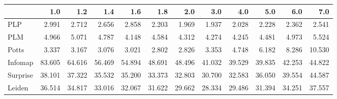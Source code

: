 \begin{tabular}{lrrrrrrrrrrr}
\toprule
{} &    1.0 &    1.2 &    1.4 &    1.6 &    1.8 &    2.0 &    3.0 &    4.0 &    5.0 &    6.0 &    7.0 \\
\midrule
PLP      &  2.991 &  2.712 &  2.656 &  2.858 &  2.203 &  1.969 &  1.937 &  2.028 &  2.228 &  2.362 &  2.541 \\
PLM      &  4.966 &  5.071 &  4.787 &  4.148 &  4.584 &  4.312 &  4.274 &  4.245 &  4.481 &  4.973 &  5.524 \\
Potts    &  3.337 &  3.167 &  3.076 &  3.021 &  2.802 &  2.826 &  3.353 &  4.748 &  6.182 &  8.286 & 10.530 \\
Infomap  & 83.605 & 64.616 & 56.469 & 54.894 & 48.691 & 48.496 & 41.032 & 39.529 & 39.835 & 42.253 & 44.822 \\
Surprise & 38.101 & 37.322 & 35.532 & 35.200 & 33.373 & 32.803 & 30.700 & 32.583 & 36.050 & 39.554 & 44.587 \\
Leiden   & 36.514 & 34.817 & 33.016 & 32.067 & 31.622 & 29.662 & 28.334 & 29.486 & 31.394 & 34.251 & 37.557 \\
\bottomrule
\end{tabular}
